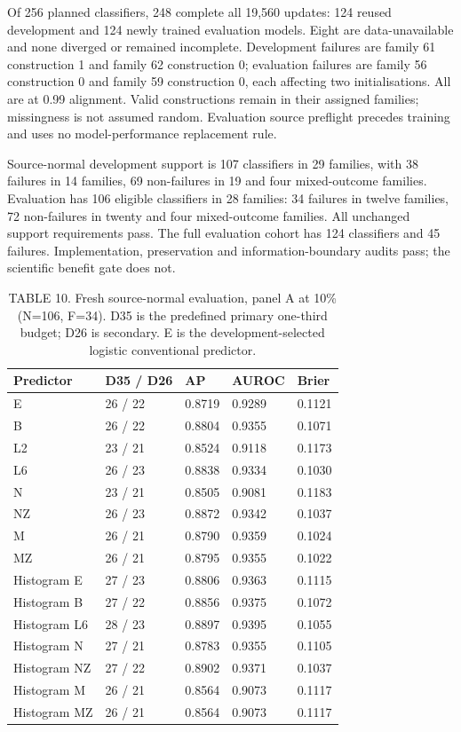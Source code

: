 Of 256 planned classifiers, 248 complete all 19,560 updates: 124 reused development and 124 newly trained evaluation models. Eight are data-unavailable and none diverged or remained incomplete. Development failures are family 61 construction 1 and family 62 construction 0; evaluation failures are family 56 construction 0 and family 59 construction 0, each affecting two initialisations. All are at 0.99 alignment. Valid constructions remain in their assigned families; missingness is not assumed random. Evaluation source preflight precedes training and uses no model-performance replacement rule.

Source-normal development support is 107 classifiers in 29 families, with 38 failures in 14 families, 69 non-failures in 19 and four mixed-outcome families. Evaluation has 106 eligible classifiers in 28 families: 34 failures in twelve families, 72 non-failures in twenty and four mixed-outcome families. All unchanged support requirements pass. The full evaluation cohort has 124 classifiers and 45 failures. Implementation, preservation and information-boundary audits pass; the scientific benefit gate does not.

\begin{table}[t]
\caption{TABLE 10. Fresh source-normal evaluation, panel A at 10\% (N=106, F=34). D35 is the predefined primary one-third budget; D26 is secondary. E is the development-selected logistic conventional predictor.}
\centering\small
\begin{tabular}{lllll}
\toprule Predictor & D35 / D26 & AP & AUROC & Brier\\\midrule
E & 26 / 22 & 0.8719 & 0.9289 & 0.1121\\
B & 26 / 22 & 0.8804 & 0.9355 & 0.1071\\
L2 & 23 / 21 & 0.8524 & 0.9118 & 0.1173\\
L6 & 26 / 23 & 0.8838 & 0.9334 & 0.1030\\
N & 23 / 21 & 0.8505 & 0.9081 & 0.1183\\
NZ & 26 / 23 & 0.8872 & 0.9342 & 0.1037\\
M & 26 / 21 & 0.8790 & 0.9359 & 0.1024\\
MZ & 26 / 21 & 0.8795 & 0.9355 & 0.1022\\
Histogram E & 27 / 23 & 0.8806 & 0.9363 & 0.1115\\
Histogram B & 27 / 22 & 0.8856 & 0.9375 & 0.1072\\
Histogram L6 & 28 / 23 & 0.8897 & 0.9395 & 0.1055\\
Histogram N & 27 / 21 & 0.8783 & 0.9355 & 0.1105\\
Histogram NZ & 27 / 22 & 0.8902 & 0.9371 & 0.1037\\
Histogram M & 26 / 21 & 0.8564 & 0.9073 & 0.1117\\
Histogram MZ & 26 / 21 & 0.8564 & 0.9073 & 0.1117\\\bottomrule
\end{tabular}
\end{table}


